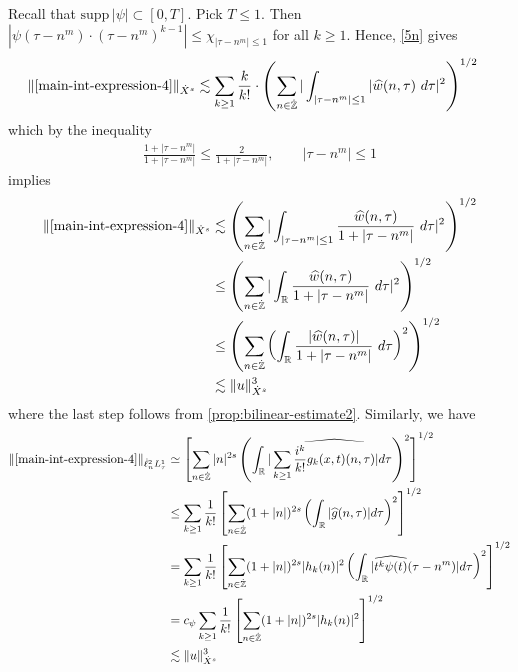 \documentclass[12pt,reqno]{amsart}
\numberwithin{equation}{section}  %
\numberwithin{figure}{section}
\newcommand{\rr}{\mathbb{R}}
\newcommand{\zz}{\mathbb{Z}}
\newcommand{\zzdot}{\dot{\zz}}
\newcommand{\wh}{\widehat}
\theoremstyle{plain}
\theoremstyle{definition}
\theoremstyle{remark}
\begin{document}
%
Recall that $\text{supp} \, |\psi| \subset [0, T ]$. Pick $T \le 1$. 
Then $| \psi\left( \tau - n^{m } \right) \cdot \left( \tau - n^{m } \right)^{k 
-1} | \le \chi_{| \tau - n^{m } | \le 1}$ for all $k \ge 1$. Hence, \eqref{5n} gives
%
\begin{equation*}
	\begin{split}
		\|\eqref{main-int-expression-4} \|_{\dot{X}^s} 
		& \lesssim \sum_{k \ge 1} \frac{k}{k!} \cdot \left( \sum_{n \in \zzdot} | 
		\int_{| \tau - n^{m}  |\le 1} | \wh{w}(n, \tau) \ d \tau |^2 
		\right)^{1/2}
	\end{split}
\end{equation*}
%
which by the inequality
%
\begin{equation*}
	\begin{split}
		\frac{1 + | \tau - n^{m } |}{1 + | \tau  - n^{m } |} \le 
		\frac{2}{1 + | \tau - n^{m } |}, \qquad | \tau - n^{m }  | \le 1
	\end{split}
\end{equation*}
%
implies
%
\begin{equation}
\label{main-int4-est-X-s-part}
	\begin{split}
		\|\eqref{main-int-expression-4}\|_{\dot{X}^s}
		& \lesssim \left( \sum_{n \in \zzdot} | \int_{| \tau - n^{m}| \le 1 }
		\frac{\wh{w}(n, \tau)}{1 + | \tau - n^{m } |} \ d \tau |^2 
		\right)^{1/2}
		\\
		& \le \left( \sum_{n \in \zzdot} | \int_\rr
		\frac{\wh{w}(n, \tau)}{1 + | \tau - n^{m } |} \ d \tau |^2 
		\right)^{1/2} \\
		& \le \left( \sum_{n \in \zzdot} \left( \int_\rr 
		\frac{|\wh{w}(n, \tau)|}{1 + | \tau - n^{m } |}  \ d \tau  \right)^2
		\right)^{1/2} \\
		& \lesssim \|u\|_{\dot{X}^s}^3
	\end{split}
\end{equation}
%
where the last step follows from \autoref{prop:bilinear-estimate2}. Similarly,
we have
%
%
\begin{equation}
\label{main-int4-est-Y-s-part}
	\begin{split}
		\|\eqref{main-int-expression-4}\|_{\dot{\ell}^2_n L^1_\tau}
		& \simeq \left[ \sum_{n \in
		\zzdot}|n|^{2s} \left( \int_{\rr} | \sum_{k \ge 1}
		\wh{\frac{i^{k}}{k!}g_{k}(x,t)(n, \tau)} |d \tau \right)^{2} \right]^{1/2}
		\\
		& \le \sum_{k \ge 1} \frac{1}{k!} \left[ \sum_{n \in \zzdot} (1 + | n
		|)^{2s} \left( \int_{\rr} | \wh{g}(n, \tau) | d \tau \right)^{2}
		\right]^{1/2}
		\\
		& = \sum_{k \ge 1} \frac{1}{k!} \left[ \sum_{n \in \zzdot} (1 + | n
		|)^{2s} | h_{k}(n) |^2 \left( \int_{\rr} | \wh{t^{k} \psi(t)}(\tau -
		n^{m}) |d \tau \right)^{2} \right]^{1/2}
		\\
		& = c_{\psi} \sum_{k \ge 1} \frac{1}{k!} \left[ \sum_{n \in \zzdot} (1 + | n
		|)^{2s} | h_{k}(n) |^2 \right]^{1/2}
		\\
		& \lesssim \|u\|_{\dot{X}^s}^{3}
	\end{split}
\end{equation}
\end{document}
